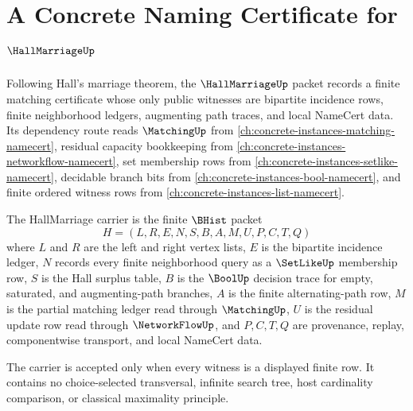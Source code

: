 \chapter{A Concrete Naming Certificate for $\HallMarriageUp$}
\label{ch:concrete-instances-hall-marriage-namecert}

Following Hall's marriage theorem, the $\HallMarriageUp$ packet records a finite matching certificate whose only public witnesses are bipartite incidence rows, finite neighborhood ledgers, augmenting path traces, and local NameCert data. Its dependency route reads $\MatchingUp$ from \autoref{ch:concrete-instances-matching-namecert}, residual capacity bookkeeping from \autoref{ch:concrete-instances-networkflow-namecert}, set membership rows from \autoref{ch:concrete-instances-setlike-namecert}, decidable branch bits from \autoref{ch:concrete-instances-bool-namecert}, and finite ordered witness rows from \autoref{ch:concrete-instances-list-namecert}.

\begin{definition}
\label{def:hall-marriage-carrier}
The HallMarriage carrier is the finite $\BHist$ packet
$$
H=(L,R,E,N,S,B,A,M,U,P,C,T,Q)
$$
where $L$ and $R$ are the left and right vertex lists, $E$ is the bipartite incidence ledger, $N$ records every finite neighborhood query as a $\SetLikeUp$ membership row, $S$ is the Hall surplus table, $B$ is the $\BoolUp$ decision trace for empty, saturated, and augmenting-path branches, $A$ is the finite alternating-path row, $M$ is the partial matching ledger read through $\MatchingUp$, $U$ is the residual update row read through $\NetworkFlowUp$, and $P,C,T,Q$ are provenance, replay, componentwise transport, and local NameCert data.

The carrier is accepted only when every witness is a displayed finite row. It contains no choice-selected transversal, infinite search tree, host cardinality comparison, or classical maximality principle.
\end{definition}

